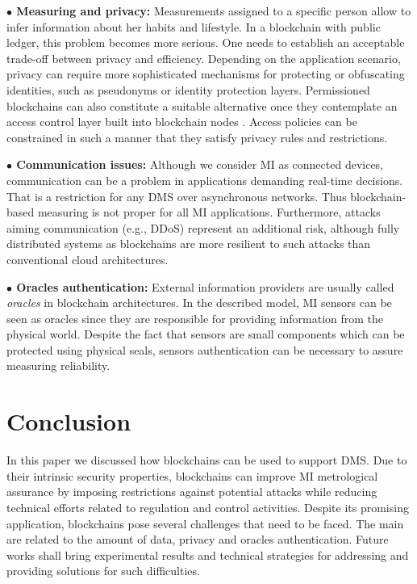 \documentclass[journal]{IEEEtran} %
\begin{document}
\textbf{$\bullet$ Measuring and privacy:} Measurements assigned to a specific person allow to infer information about her habits and lifestyle. In a blockchain with public ledger, this problem becomes more serious. One needs to establish an acceptable trade-off between privacy and efficiency. Depending on the application scenario, privacy can require more sophisticated mechanisms for protecting or obfuscating identities, such as pseudonyms or identity protection layers. Permissioned blockchains can also constitute a suitable alternative once they contemplate an access control layer built into blockchain nodes \cite{Vukolic2017a,Vukolic2016}. Access policies can be constrained in such a manner that they satisfy privacy rules and restrictions.

\textbf{$\bullet$ Communication issues:} Although we consider MI as connected devices, communication can be a problem in applications demanding real-time decisions. That is a restriction for any DMS over asynchronous networks. Thus blockchain-based measuring is not proper for all MI applications. Furthermore, attacks aiming communication (e.g., DDoS) represent an additional risk, although fully distributed systems as blockchains are more resilient to such attacks than conventional cloud architectures.

\textbf{$\bullet$ Oracles authentication:} External information providers are usually called \emph{oracles} in blockchain architectures. In the described model, MI sensors can be seen as oracles since they are responsible for providing information from the physical world. Despite the fact that sensors are small components which can be protected using physical seals, sensors authentication can be necessary to assure measuring reliability.


\section{Conclusion}
In this paper we discussed how blockchains can be used to support DMS. Due to their intrinsic security properties, blockchains can improve MI metrological assurance by imposing restrictions against potential attacks while reducing technical efforts related to regulation and control activities. Despite its promising application, blockchains pose several challenges that need to be faced. The main are related to the amount of data, privacy and oracles authentication. Future works shall bring experimental results and technical strategies for addressing and providing solutions for such difficulties.
\end{document}
